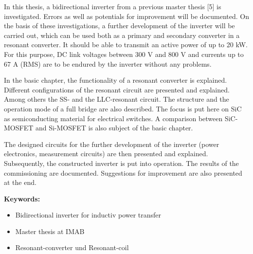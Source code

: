 \label{abtract} 

In this thesis, a bidirectional inverter from a previous master thesis [5] is investigated. Errors as well as potentials for improvement will be documented. On the basis of these investigations, a further development of the inverter will be carried out, which can be used both as a primary and secondary converter in a resonant converter. It should be able to transmit an active power of up to 20 kW. For this purpose, DC link voltages between 300 V and 800 V and currents up to 67 A (RMS) are to be endured by the inverter without any problems.

In the basic chapter, the functionality of a resonant converter is explained. Different configurations of the resonant circuit are presented and explained. Among others the SS- and the LLC-resonant circuit. The structure and the operation mode of a full bridge are also described. The focus is put here on SiC as semiconducting material for electrical switches. A comparison between SiC-MOSFET and Si-MOSFET is also subject of the basic chapter.

The designed circuits for the further development of the inverter (power electronics, measurement circuits) are then presented and explained. Subsequently, the constructed inverter is put into operation. The results of the commissioning are documented. Suggestions for improvement are also presented at the end.

\vspace{1cm}

\textbf{Keywords:}
\begin{itemize}
 \item Bidirectional inverter for inductiv power transfer
 \item Master thesis at IMAB
 \item Resonant-converter und Resonant-coil
\end{itemize}




